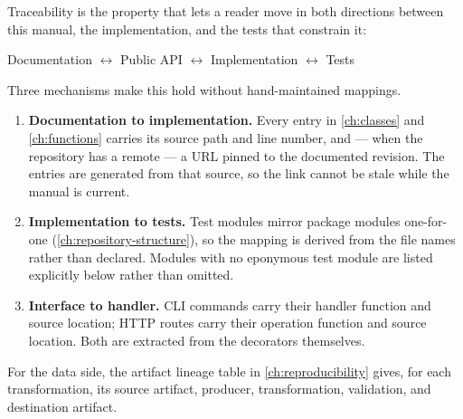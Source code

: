 
Traceability is the property that lets a reader move in both directions between
this manual, the implementation, and the tests that constrain it:

\begin{center}
Documentation $\longleftrightarrow$ Public API $\longleftrightarrow$
Implementation $\longleftrightarrow$ Tests
\end{center}

Three mechanisms make this hold without hand-maintained mappings.

\begin{enumerate}
  \item \textbf{Documentation to implementation.} Every entry in
    \cref{ch:classes} and \cref{ch:functions} carries its source path and line
    number, and --- when the repository has a remote --- a URL pinned to the
    documented revision. The entries are generated from that source, so the
    link cannot be stale while the manual is current.
  \item \textbf{Implementation to tests.} Test modules mirror package modules
    one-for-one (\cref{ch:repository-structure}), so the mapping is derived
    from the file names rather than declared. Modules with no eponymous test
    module are listed explicitly below rather than omitted.
  \item \textbf{Interface to handler.} CLI commands carry their handler
    function and source location; HTTP routes carry their operation function
    and source location. Both are extracted from the decorators themselves.
\end{enumerate}

For the data side, the artifact lineage table in \cref{ch:reproducibility}
gives, for each transformation, its source artifact, producer, transformation,
validation, and destination artifact.


